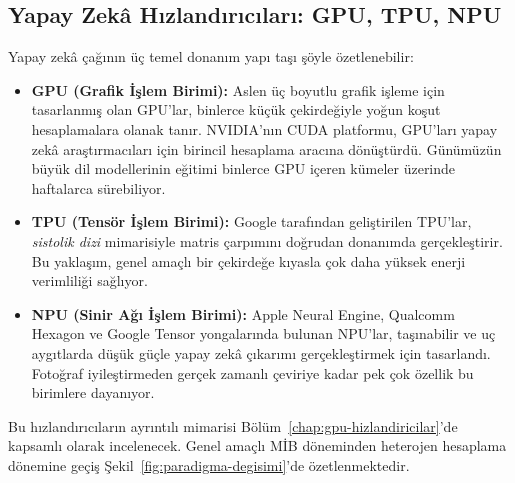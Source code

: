 \subsection{Yapay Zekâ Hızlandırıcıları: GPU, TPU, NPU}
\label{sec:yz-hizlandiricilar-giris}

Yapay zekâ çağının üç temel donanım yapı taşı şöyle özetlenebilir:

\begin{itemize}
    \item \textbf{GPU (Grafik İşlem Birimi):} Aslen üç boyutlu grafik işleme için tasarlanmış olan GPU'lar, binlerce küçük çekirdeğiyle yoğun koşut hesaplamalara olanak tanır. NVIDIA'nın CUDA platformu, GPU'ları yapay zekâ araştırmacıları için birincil hesaplama aracına dönüştürdü. Günümüzün büyük dil modellerinin eğitimi binlerce GPU içeren kümeler üzerinde haftalarca sürebiliyor.

    \item \textbf{TPU (Tensör İşlem Birimi):} Google tarafından geliştirilen TPU'lar, \emph{sistolik dizi} mimarisiyle matris çarpımını doğrudan donanımda gerçekleştirir. Bu yaklaşım, genel amaçlı bir çekirdeğe kıyasla çok daha yüksek enerji verimliliği sağlıyor.

    \item \textbf{NPU (Sinir Ağı İşlem Birimi):} Apple Neural Engine, Qualcomm Hexagon ve Google Tensor yongalarında bulunan NPU'lar, taşınabilir ve uç aygıtlarda düşük güçle yapay zekâ çıkarımı gerçekleştirmek için tasarlandı. Fotoğraf iyileştirmeden gerçek zamanlı çeviriye kadar pek çok özellik bu birimlere dayanıyor.
\end{itemize}
Bu hızlandırıcıların ayrıntılı mimarisi Bölüm~\ref{chap:gpu-hizlandiricilar}'de kapsamlı olarak incelenecek. Genel amaçlı MİB döneminden heterojen hesaplama dönemine geçiş Şekil~\ref{fig:paradigma-degisimi}'de özetlenmektedir.

